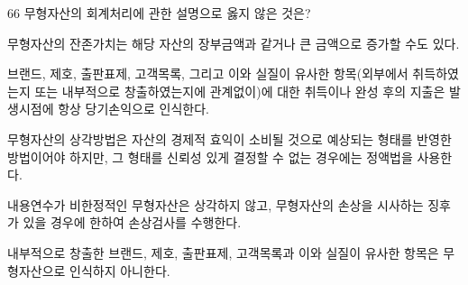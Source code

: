 \begin{question}{66}
무형자산의 회계처리에 관한 설명으로 옳지 않은 것은?
\begin{choices}
  \item 무형자산의 잔존가치는 해당 자산의 장부금액과 같거나 큰 금액으로 증가할 수도 있다.
  \item 브랜드, 제호, 출판표제, 고객목록, 그리고 이와 실질이 유사한 항목(외부에서 취득하였는지 또는 내부적으로 창출하였는지에 관계없이)에 대한 취득이나 완성 후의 지출은 발생시점에 항상 당기손익으로 인식한다.
  \item 무형자산의 상각방법은 자산의 경제적 효익이 소비될 것으로 예상되는 형태를 반영한 방법이어야 하지만, 그 형태를 신뢰성 있게 결정할 수 없는 경우에는 정액법을 사용한다.
  \item 내용연수가 비한정적인 무형자산은 상각하지 않고, 무형자산의 손상을 시사하는 징후가 있을 경우에 한하여 손상검사를 수행한다.
  \item 내부적으로 창출한 브랜드, 제호, 출판표제, 고객목록과 이와 실질이 유사한 항목은 무형자산으로 인식하지 아니한다.
\end{choices}
\end{question}
